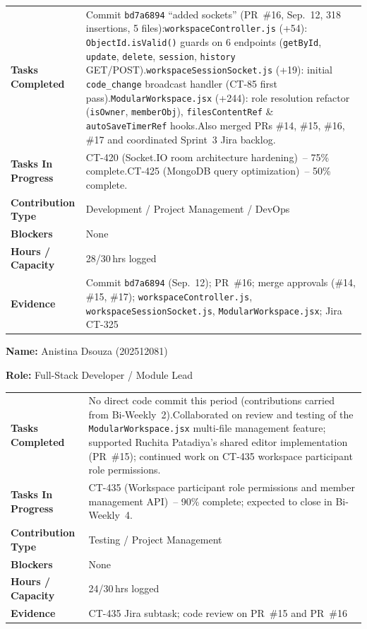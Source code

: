 \documentclass[11pt,a4paper]{article}
\newcommand{\field}[2]{\textbf{#1:} #2\par}
\begin{document}
{\small
\begin{tabular}{>{\bfseries}p{} p{}}
\toprule
Tasks Completed & Commit \texttt{bd7a6894} ``added sockets'' (PR~\#16, Sep.\ 12, 318 insertions, 5 files):\newline \texttt{workspaceController.js} (+54): \texttt{ObjectId.isValid()} guards on 6 endpoints (\texttt{getById}, \texttt{update}, \texttt{delete}, \texttt{session}, \texttt{history} GET/POST).\newline \texttt{workspaceSessionSocket.js} (+19): initial \texttt{code\_change} broadcast handler (CT-85 first pass).\newline \texttt{ModularWorkspace.jsx} (+244): role resolution refactor (\texttt{isOwner}, \texttt{memberObj}), \texttt{filesContentRef} \& \texttt{autoSaveTimerRef} hooks.\newline Also merged PRs \#14, \#15, \#16, \#17 and coordinated Sprint~3 Jira backlog. \\
Tasks In Progress & CT-420 (Socket.IO room architecture hardening)~-- 75\% complete.\newline CT-425 (MongoDB query optimization)~-- 50\% complete. \\
Contribution Type & Development / Project Management / DevOps \\
Blockers & None \\
Hours / Capacity & 28/30\,hrs logged \\
Evidence & Commit \texttt{bd7a6894} (Sep.\ 12); PR~\#16; merge approvals (\#14, \#15, \#17); \texttt{workspaceController.js}, \texttt{workspaceSessionSocket.js}, \texttt{ModularWorkspace.jsx}; Jira CT-325 \\
\bottomrule
\end{tabular}
}

\vspace{6pt}

\field{Name}{Anistina Dsouza (202512081)}
\field{Role}{Full-Stack Developer / Module Lead}

\vspace{4pt}

{\small
\begin{tabular}{>{\bfseries}p{} p{}}
\toprule
Tasks Completed & No direct code commit this period (contributions carried from Bi-Weekly~2).\newline Collaborated on review and testing of the \texttt{ModularWorkspace.jsx} multi-file management feature; supported Ruchita Patadiya's shared editor implementation (PR~\#15); continued work on CT-435 workspace participant role permissions. \\
Tasks In Progress & CT-435 (Workspace participant role permissions and member management API)~-- 90\% complete; expected to close in Bi-Weekly~4. \\
Contribution Type & Testing / Project Management \\
Blockers & None \\
Hours / Capacity & 24/30\,hrs logged \\
Evidence & CT-435 Jira subtask; code review on PR~\#15 and PR~\#16 \\
\bottomrule
\end{tabular}
}
\end{document}
